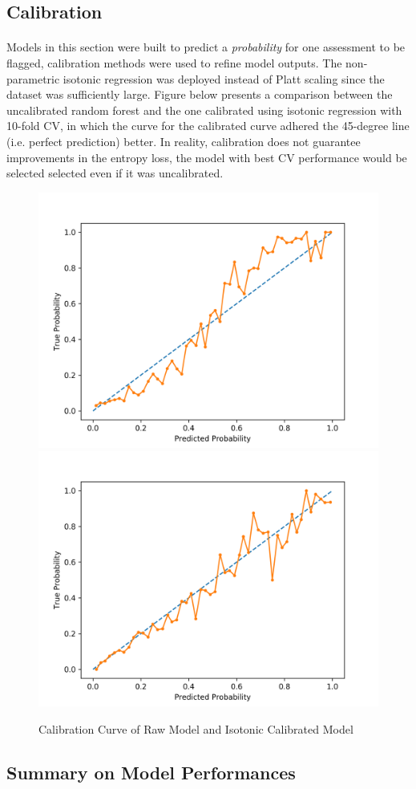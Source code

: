 \documentclass[11pt]{article}
\begin{document}
 	\subsection{Calibration}
 	\paragraph{} Models in this section were built to predict a \emph{probability} for one assessment to be flagged, calibration methods were used to refine model outputs. The non-parametric isotonic regression was deployed instead of Platt scaling since the dataset was sufficiently large. Figure below presents a comparison between the uncalibrated random forest and the one calibrated using isotonic regression with 10-fold CV, in which the curve for the calibrated curve adhered the 45-degree line (i.e. perfect prediction) better. In reality, calibration does not guarantee improvements in the entropy loss, the model with best CV performance would be selected  selected even if it was uncalibrated.
 	\begin{figure}[H]
 		\centering
 		\includegraphics[width=0.5\linewidth]{figures/calibration_curve_raw_model.png}
 		\includegraphics[width=0.5\linewidth]{figures/calibration_curve_calibrated_model.png}
 		\caption{Calibration Curve of Raw Model and Isotonic Calibrated Model}
 	\end{figure}
 	\subsection{Summary on Model Performances}
\end{document}
